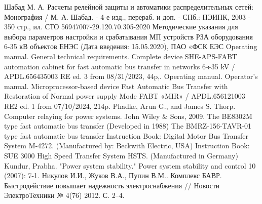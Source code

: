 



Шабад М. А. Расчеты релейной защиты и автоматики распределительных
сетей: Монография / М. А. Шабад. - 4-е изд., перераб. и доп. - СПб.: ПЭИПК, 2003 - 350
стр., ил.
СТО 56947007-29.120.70.305-2020 Методические указания для выбора параметров настройки и
срабатывания МП устройств РЗА оборудования 6-35 кВ объектов ЕНЭС (Дата введения:
15.05.2020), ПАО «ФСК ЕЭС
Operating manual. General technical requirements. Complete device SHE-APS-FABT automation
cabinet for fast automatic bus transfer in networks 6÷35 kV / APDL.656435003 RE ed. 3 from
08/31/2023, 44p,.
Operating manual. Operator's manual. Microprocessor-based device Fast Automatic Bus
Transfer with Restoration of Normal power supply Mode FABT «MIR» / APDL.656121003 RE2 ed.
1 from 07/10/2024, 214p.
Phadke, Arun G., and James S. Thorp. Computer relaying for power systems. John Wiley \&
Sons, 2009.
The BE8302M type fast automatic bus transfer (Developed in 1988)
The BMRZ-156-TAVR-01 type fast automatic bus transfer
Instruction Book: Digital Motor Bus Transfer System M‑4272. (Manufactured by: Beckwith
Electric, USA)
Instruction Book: SUE 3000 High Speed Transfer System HSTS. (Manufactured in Germany)
Kundur, Prabha. "Power system stability." Power system stability and control 10 (2007):
7-1.
Никулов И.И., Жуков В.А., Пупин В.М.. Комплекс БАВР. Быстродействие повышает надежность
электроснабжения // Новости ЭлектроТехники № 4(76) 2012. С. 2–4.

